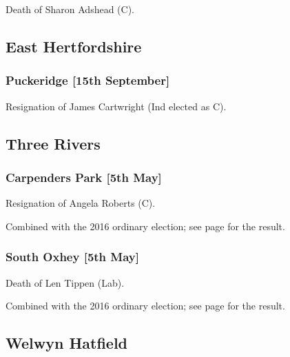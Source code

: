 \documentclass[a4paper,openany]{book}
\begin{document}
\begin{resultsiii}
Death of Sharon Adshead (C).

\subsection*{East Hertfordshire}

\subsubsection*{Puckeridge \hspace*{\fill}\nolinebreak[1]%
\enspace\hspace*{\fill}
[15th September]}


Resignation of James Cartwright (Ind elected as C).

\subsection*{Three Rivers}

\subsubsection*{Carpenders Park \hspace*{\fill}\nolinebreak[1]%
\enspace\hspace*{\fill}
[5th May]}


Resignation of Angela Roberts (C).

Combined with the 2016 ordinary election; see page \pageref{CarpendersParkThreeRivers} for the result.

\subsubsection*{South Oxhey \hspace*{\fill}\nolinebreak[1]%
\enspace\hspace*{\fill}
[5th May]}


Death of Len Tippen (Lab).

Combined with the 2016 ordinary election; see page \pageref{SouthOxheyThreeRivers} for the result.

\subsection*{Welwyn Hatfield}


\end{resultsiii}
\end{document}
